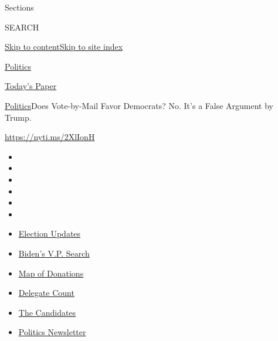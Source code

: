 Sections

SEARCH

\protect\hyperlink{site-content}{Skip to
content}\protect\hyperlink{site-index}{Skip to site index}

\href{https://www.nytimes.com/section/politics}{Politics}

\href{https://myaccount.nytimes.com/auth/login?response_type=cookie\&client_id=vi}{}

\href{https://www.nytimes.com/section/todayspaper}{Today's Paper}

\href{/section/politics}{Politics}\textbar{}Does Vote-by-Mail Favor
Democrats? No. It's a False Argument by Trump.

\url{https://nyti.ms/2XlIonH}

\begin{itemize}
\item
\item
\item
\item
\item
\item
\end{itemize}

\begin{itemize}
\item
  \href{https://www.nytimes.com/2020/07/31/us/elections/biden-vs-trump.html?action=click\&pgtype=Article\&state=default\&region=TOP_BANNER\&context=storylines_menu}{Election
  Updates}
\item
  \href{https://www.nytimes.com/article/biden-vice-president-2020.html?action=click\&pgtype=Article\&state=default\&region=TOP_BANNER\&context=storylines_menu}{Biden's
  V.P. Search}
\item
  \href{https://www.nytimes.com/interactive/2020/07/24/us/politics/trump-biden-campaign-donors.html?action=click\&pgtype=Article\&state=default\&region=TOP_BANNER\&context=storylines_menu}{Map
  of Donations}
\item
  \href{https://www.nytimes.com/interactive/2020/us/elections/delegate-count-primary-results.html?action=click\&pgtype=Article\&state=default\&region=TOP_BANNER\&context=storylines_menu}{Delegate
  Count}
\item
  \href{https://www.nytimes.com/interactive/2019/us/politics/2020-presidential-candidates.html?action=click\&pgtype=Article\&state=default\&region=TOP_BANNER\&context=storylines_menu}{The
  Candidates}
\item
  \href{https://www.nytimes.com/newsletters/politics?action=click\&pgtype=Article\&state=default\&region=TOP_BANNER\&context=storylines_menu}{Politics
  Newsletter}
\end{itemize}

